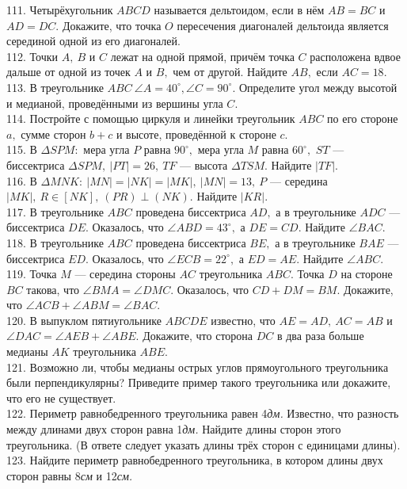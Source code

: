 111. Четырёхугольник $ABCD$ называется дельтоидом, если в нём $AB=BC$ и $AD=DC.$ Докажите, что точка $O$ пересечения диагоналей дельтоида является серединой одной из его диагоналей. \\
112. Точки $A,\ B$ и $C$ лежат на одной прямой, причём точка $C$ расположена вдвое дальше от одной из точек $A$ и $B,$ чем от другой. Найдите $AB,$ если $AC=18.$\\
113. В треугольнике $ABC\ \angle A=40^\circ, \angle C=90^\circ.$ Определите угол между высотой и медианой, проведёнными из вершины угла $C.$\\
114. Постройте с помощью циркуля и линейки треугольник $ABC$ по его стороне $a,$ сумме сторон $b+c$ и высоте, проведённой к стороне $c.$\\
115. В $\Delta SPM:$ мера угла $P$ равна $90^\circ,$ мера угла $M$ равна $60^\circ,$ $ST$ --- биссектриса $\Delta SPM,\ |PT|=26,\ TF$ --- высота $\Delta TSM.$ Найдите $|TF|.$\\
116. В $\Delta MNK:\ |MN|=|NK|=|MK|,\ |MN|=13,\ P$ --- середина $|MK|,\ R\in[NK],\ (PR)\perp(NK).$ Найдите $|KR|.$\\
117. В треугольнике $ABC$ проведена биссектриса $AD,$ а в треугольнике $ADC$ --- биссектриса $DE.$ Оказалось, что $\angle ABD=43^\circ,$ а $DE=CD.$ Найдите $\angle BAC.$\\
118. В треугольнике $ABC$ проведена биссектриса $BE,$ а в треугольнике $BAE$ --- биссектриса $ED.$ Оказалось, что $\angle ECB=22^\circ,$ а $ED=AE.$ Найдите $\angle ABC.$\\
119. Точка $M$ --- середина стороны $AC$ треугольника $ABC.$ Точка $D$ на стороне $BC$ такова, что $\angle BMA=\angle DMC.$ Оказалось, что $CD+DM=BM.$ Докажите, что $\angle ACB+\angle ABM=\angle BAC.$\\
120. В выпуклом пятиугольнике $ABCDE$ известно, что $AE=AD,\ AC=AB$ и $\angle DAC=\angle AEB+\angle ABE.$ Докажите, что сторона $DC$ в два раза больше медианы $AK$ треугольника $ABE.$\\
121. Возможно ли, чтобы медианы острых углов прямоугольного треугольника были перпендикулярны? Приведите пример такого треугольника или докажите, что его не существует.\\
122. Периметр равнобедренного треугольника равен 4{\it дм.} Известно, что разность между длинами двух сторон равна 1{\it дм.} Найдите длины сторон этого треугольника. (В ответе следует указать длины трёх сторон с единицами длины).\\
123. Найдите периметр равнобедренного треугольника, в котором длины двух сторон равны 8{\it см} и 12{\it см.}\\
